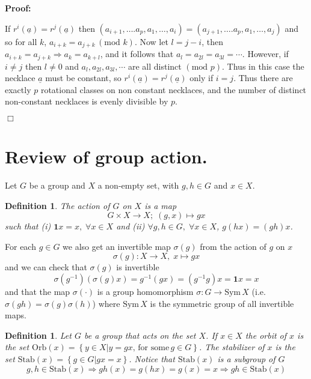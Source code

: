 \documentclass[english]{article}
\newtheorem{definition}[theorem]{Definition}
\newenvironment{proof}{\noindent \textbf{Proof:}}{$\Box$}
\newcommand{\modulo}[1]{ (\mbox{mod }{#1})} %
\begin{document}
\begin{proof}

If $r^{i}\left(\underline{a}\right)=r^{j}\left(\underline{a}\right)$
then $\left(a_{i+1},\ldots.a_{p},a_{1},\ldots,a_{i}\right)=\left(a_{j+1},\ldots.a_{p},a_{1},\ldots,a_{j}\right)$
and so for all $k$, $a_{i+k}=a_{j+k}\,\modulo{k}$. Now let $l=j-i$,
then $a_{i+k}=a_{j+k}\Rightarrow a_{k}=a_{k+l}$, and it follows that
$a_{l}=a_{2l}=a_{3l}=\cdots$. However, if $i\ne j$ then $l\ne0$
and $a_{l},a_{2l},a_{3l},\cdots$ are all distinct $\modulo{p}$.
Thus in this case the necklace $\underline{a}$ must be constant,
so $r^{i}\left(\underline{a}\right)=r^{j}\left(\underline{a}\right)$
only if $i=j$. Thus there are exactly $p$ rotational classes on
non constant necklaces, and the number of distinct non-constant necklaces
is evenly divisible by $p$.

\end{proof}


\section{Review of group action.}

Let $G$ be a group and $X$ a non-empty set, with $g,h\in G$ and
$x\in X$.

\begin{definition}

The \emph{action} of $G$ on $X$ is a map\[
G\times X\rightarrow X;\;\left(g,x\right)\mapsto gx\]
such that (i) $\mathbf{1}x=x,\;\forall x\in X$ and (ii) $\forall g,h\in G,\;\forall x\in X$,
$g\left(hx\right)=\left(gh\right)x$. 

\end{definition} 

For each $g\in G$ we also get an invertible map $\sigma(g)$ from
the action of $g$ on $x$ \[
\sigma\left(g\right):X\rightarrow X,\; x\mapsto gx\]
and we can check that $\sigma\left(g\right)$ is invertible \[
\sigma\left(g^{-1}\right)\left(\sigma\left(g\right)x\right)=g^{-1}\left(gx\right)=\left(g^{-1}g\right)x=\mathbf{1}x=x\]
and that the map $\sigma(\cdot)$ is a group homomorphism $\sigma:G\rightarrow\text{Sym}\, X$
(i.e. $\sigma(gh)=\sigma(g)\sigma(h)$) where $\text{Sym}\, X$ is
the symmetric group of all invertible maps. 

\begin{definition}

Let $G$ be a group that acts on the set $X$. If $x\in X$ the \emph{orbit}
of $x$ is the set $\text{Orb}\left(x\right)=\left\{ y\in X|y=gx,\,\text{for some}\, g\in G\right\} $.
The \emph{stabilizer} of $x$ is the set $\text{Stab}\left(x\right)=\left\{ g\in G|gx=x\right\} $.
Notice that $\text{Stab}\left(x\right)$ is a subgroup of $G$ \[
g,h\in\text{Stab}\left(x\right)\Rightarrow gh\left(x\right)=g\left(hx\right)=g\left(x\right)=x\Rightarrow gh\in\text{Stab}\left(x\right)\]


\end{definition}
\end{document}
